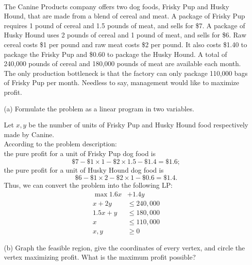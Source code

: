 \documentclass[12pt]{amsart}
\theoremstyle{plain}
\theoremstyle{definition}
\theoremstyle{remark}
\begin{document}
	\newpage
	 \\
	The Canine Products company offers two dog foods, Frisky Pup and Husky Hound, that are made from a blend of cereal and meat.  A package of Frisky Pup requires 1 pound of cereal and 1.5 pounds of meat, and sells for \$7.  A package of Husky Hound uses 2 pounds of cereal and 1 pound of meat, and sells for \$6.  Raw cereal costs \$1 per pound and raw meat costs \$2 per pound.  It also costs \$1.40 to package the Frisky Pup and \$0.60 to package the Husky Hound.  A total of 240,000 pounds of cereal and 180,000 pounds of meat are available each month.  The only production bottleneck is that the factory can only package 110,000 bags of Frisky Pup per month.  Needless to say, management would like to maximize profit.
	
	(a) Formulate the problem as a linear program in two variables.
	
	\begin{tcolorbox}
		Let $x, y$ be the number of units of Frisky Pup and Husky Hound food respectively made by Canine.\\
		According to the problem description:\\
		the pure profit for a unit of Frisky Pup dog food is 
		\[  \$7 - \$1 \times 1  - \$2 \times 1.5 - \$1.4 = \$1.6;  \]
		the pure profit for a unit of Husky Hound dog food is 
		\[  \$6 - \$1 \times 2  - \$2 \times 1 - \$0.6 = \$1.4.  \]
		Thus, we can convert the problem into the following LP:
		\begin{equation} \nonumber
		\begin{split}
		\max 1.6x & + 1.4y \\
		x + 2y & \leq 240,000 \\
		1.5x + y & \leq 180,000 \\
		x & \leq 110,000 \\
		x, y & \geq 0
		\end{split}
		\end{equation}
	\end{tcolorbox}

	\newpage
	(b) Graph the feasible region, give the coordinates of every vertex, and circle the vertex maximizing profit.  What is the maximum profit possible?
	
\end{document}
